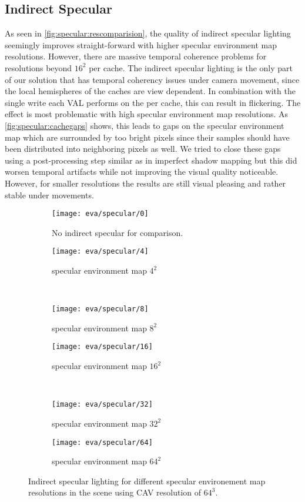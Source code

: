 \documentclass[thesis.tex]{subfiles}
\begin{document}
\subsection{Indirect Specular}\label{sec:eva:specquality}
As seen in \autoref{fig:specular:rescomparision}, the quality of indirect specular lighting seemingly improves straight-forward with higher specular environment map resolutions.
However, there are massive temporal coherence problems for resolutions beyond $16^2$ per cache.
The indirect specular lighting is the only part of our solution that has temporal coherency issues under camera movement, since the local hemispheres of the caches are view dependent.
In combination with the single write each VAL performs on the per cache, this can result in flickering.
The effect is most problematic with high specular environment map resolutions.
As \autoref{fig:specular:cachegaps} shows, this leads to gaps on the specular environment map which are surrounded by too bright pixels since their samples should have been distributed into neighboring pixels as well.
We tried to close these gaps using a post-processing step similar as in imperfect shadow mapping \cite{bib:imperfectshadowmaps} but this did worsen temporal artifacts while not improving the visual quality noticeable.
However, for smaller resolutions the results are still visual pleasing and rather stable under movements.
%
\begin{figure}
\begin{subfigure}[b]{\halfpageimage}
\texttt{[image: eva/specular/0]}
\caption{No indirect specular for comparison.}
\end{subfigure}
\begin{subfigure}[b]{\halfpageimage}
\texttt{[image: eva/specular/4]}
\caption{specular environment map $4^2$}
\end{subfigure}
\\
\begin{subfigure}[b]{\halfpageimage}
\texttt{[image: eva/specular/8]}
\caption{specular environment map $8^2$}
\end{subfigure}
\begin{subfigure}[b]{\halfpageimage}
\texttt{[image: eva/specular/16]}
\caption{specular environment map $16^2$}
\end{subfigure}
\\
\begin{subfigure}[b]{\halfpageimage}
\texttt{[image: eva/specular/32]}
\caption{specular environment map $32^2$}
\end{subfigure}
\begin{subfigure}[b]{\halfpageimage}
\texttt{[image: eva/specular/64]}
\caption{specular environment map $64^2$}
\end{subfigure}
\caption{Indirect specular lighting for different specular environement map resolutions in the  scene using CAV resolution of $64^3$. }
\label{fig:specular:rescomparision}
\end{figure}
\end{document}
